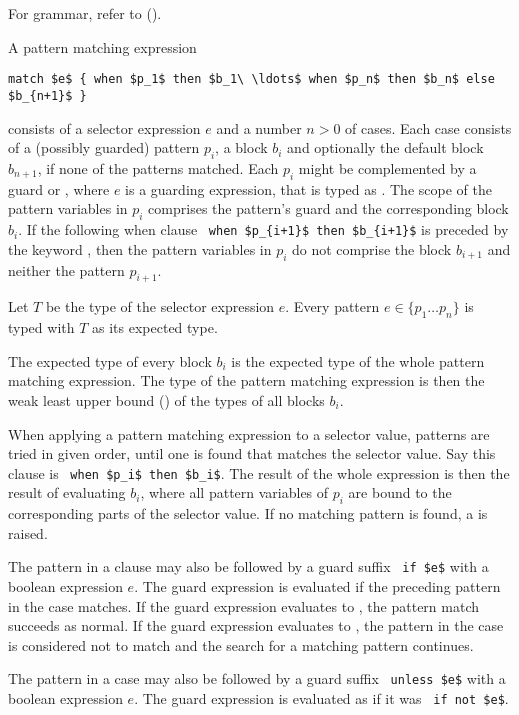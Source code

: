 For grammar, refer to ().

A pattern matching expression 
\begin{lstlisting}
match $e$ { when $p_1$ then $b_1\ \ldots$ when $p_n$ then $b_n$ else $b_{n+1}$ }
\end{lstlisting}
consists of a selector expression $e$ and a number $n > 0$ of cases. Each case consists of a (possibly guarded) pattern $p_i$, a block $b_i$ and optionally the default block $b_{n+1}$, if none of the patterns matched. Each $p_i$ might be complemented by a guard  or , where $e$ is a guarding expression, that is typed as . The scope of the pattern variables in $p_i$ comprises the pattern's guard and the corresponding block $b_i$. If the following when clause ~\lstinline!when $p_{i+1}$ then $b_{i+1}$! is preceded by the keyword , then the pattern variables in $p_i$ do not comprise the block $b_{i+1}$ and neither the pattern $p_{i+1}$. 

Let $T$ be the type of the selector expression $e$. Every pattern $e \in \{ p_1 \ldots p_n \}$ is typed with $T$ as its expected type. 

The expected type of every block $b_i$ is the expected type of the whole pattern matching expression. The type of the pattern matching expression is then the weak least upper bound () of the types of all blocks $b_i$. 

When applying a pattern matching expression to a selector value, patterns are tried in given order, until one is found that matches the selector value. Say this  clause is ~\lstinline!when $p_i$ then $b_i$!. The result of the whole expression is then the result of evaluating $b_i$, where all pattern variables of $p_i$ are bound to the corresponding parts of the selector value. If no matching pattern is found, a  is raised. 

The pattern in a  clause may also be followed by a guard suffix ~\lstinline!if $e$! with a boolean expression $e$. The guard expression is evaluated if the preceding pattern in the case matches. If the guard expression evaluates to , the pattern match succeeds as normal. If the guard expression evaluates to , the pattern in the case is considered not to match and the search for a matching pattern continues. 

The pattern in a case may also be followed by a guard suffix ~\lstinline!unless $e$! with a boolean expression $e$. The guard expression is evaluated as if it was ~\lstinline!if not $e$!. 

